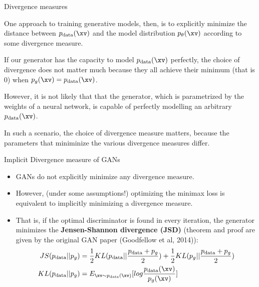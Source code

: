 \begin{frame} {Divergence measures}
  \begin{itemize}
    \small{\item One approach to training generative models, then, is to explicitly minimize the distance between $p_{\text{data}}(\xv)$ and the model distribution $p_{\theta}(\xv)$ according to some divergence measure.
    \vspace{2mm}
    \item If our generator has the capacity to model $p_{\text{data}}(\xv)$ perfectly, the choice of divergence does not matter much because they all achieve their minimum (that is 0) when $p_g(\xv) = p_{\text{data}}(\xv)$.
    \vspace{2mm}
    \item However, it is not likely that that the generator, which is  parametrized by the weights of a neural network, is capable of perfectly modelling an arbitrary $ p_{\text{data}}(\xv)$.
    \vspace{2mm}
    \item In such a scenario, the choice of divergence measure matters, because the parameters that miniminize the various divergence measures differ.}
  \end{itemize}
\end{frame}

\begin{frame} {Implicit Divergence measure of GANs}
  \begin{itemize}
   \item GANs do not explicitly minimize any divergence measure.
   \item However, (under some assumptions!) optimizing the minimax loss is equivalent to implicitly minimizing a divergence measure.
    \item That is, if the optimal discriminator is found in every iteration,  the generator minimizes %
    the  \textbf{Jensen-Shannon divergence  (JSD)} (theorem and proof are given by the original GAN paper (Goodfellow et al, 2014)):
    \begin{align*}
      JS(p_{\text{data}}||p_g) & =  \frac{1}{2} KL(p_{\text{data}}||\frac{p_{\text{data}}+p_g}{2}) + \frac{1}{2}  KL(p_g || \frac {p_{\text{data}} + p_g}{2}) \\
        KL(p_{\text{data}}||p_g) & = E_{\xv \sim p_{\text{data}}(\xv)}[log \frac {p_{\text{data}}(\xv)}{p_g(\xv)}]
    \end{align*}
  \end{itemize}
\end{frame}


